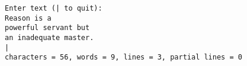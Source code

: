 \begin{frame}\ft{\secname}

\end{frame}


\begin{frame}[fragile]\ft{\secname}
\begin{lstlisting}[backgroundcolor=\color{blue!20}]
Enter text (| to quit):
Reason is a 
powerful servant but
an inadequate master.
|
characters = 56, words = 9, lines = 3, partial lines = 0
\end{lstlisting}
\end{frame}

